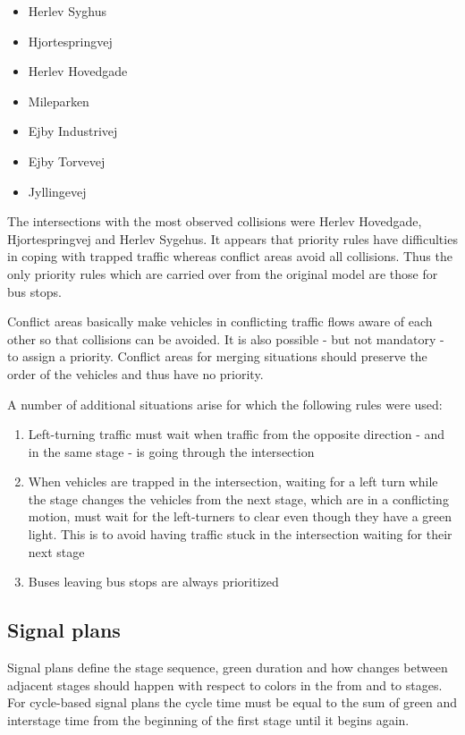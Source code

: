 \begin{itemize}
\item Herlev Syghus
\item Hjortespringvej
\item Herlev Hovedgade
\item Mileparken
\item Ejby Industrivej
\item Ejby Torvevej
\item Jyllingevej
\end{itemize}

The intersections with the most observed collisions were Herlev Hovedgade, Hjortespringvej and Herlev Sygehus. It appears that priority rules have difficulties in coping with trapped traffic whereas conflict areas avoid all collisions.
Thus the only priority rules which are carried over from the original model are those for bus stops. 

Conflict areas basically make vehicles in conflicting traffic flows aware of each other so that collisions can be avoided. It is also possible - but not mandatory - to assign a priority. Conflict areas for merging situations should preserve the order of the vehicles and thus have no priority. 

A number of additional situations arise for which the following rules were used:

\begin{enumerate}
\item Left-turning traffic must wait when traffic from the opposite direction - and in the same stage - is going through the intersection
\item When vehicles are trapped in the intersection, waiting for a left turn while the stage changes the vehicles from the next stage, which are in a conflicting motion, must wait for the left-turners to clear even though they have a green light. This is to avoid having traffic stuck in the intersection waiting for their next stage
\item Buses leaving bus stops are always prioritized
\end{enumerate}

\subsection{Signal plans}
Signal plans define the stage sequence, green duration and how changes between adjacent stages should happen with respect to colors in the from and to stages. For cycle-based signal plans the cycle time must be equal to the sum of green and interstage time from the beginning of the first stage until it begins again.

